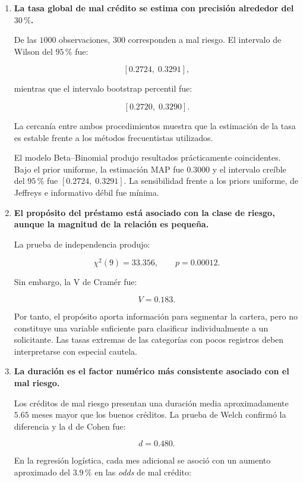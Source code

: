 \begin{enumerate}

    \item \textbf{La tasa global de mal crédito se estima con precisión
    alrededor del \(30\,\%\).}

    De las \(1000\) observaciones, \(300\) corresponden a mal riesgo. El
    intervalo de Wilson del \(95\,\%\) fue:

    \[
    [0.2724,\;0.3291],
    \]

    mientras que el intervalo bootstrap percentil fue:

    \[
    [0.2720,\;0.3290].
    \]

    La cercanía entre ambos procedimientos muestra que la estimación de
    la tasa es estable frente a los métodos frecuentistas utilizados.

    El modelo Beta--Binomial produjo resultados prácticamente
    coincidentes. Bajo el prior uniforme, la estimación MAP fue
    \(0.3000\) y el intervalo creíble del \(95\,\%\) fue
    \([0.2724,\;0.3291]\). La sensibilidad frente a los priors uniforme,
    de Jeffreys e informativo débil fue mínima.

    \item \textbf{El propósito del préstamo está asociado con la clase de
    riesgo, aunque la magnitud de la relación es pequeña.}

    La prueba de independencia produjo:

    \[
    \chi^2(9)=33.356,
    \qquad
    p=0.00012.
    \]

    Sin embargo, la V de Cramér fue:

    \[
    V=0.183.
    \]

    Por tanto, el propósito aporta información para segmentar la cartera,
    pero no constituye una variable suficiente para clasificar
    individualmente a un solicitante. Las tasas extremas de las categorías
    con pocos registros deben interpretarse con especial cautela.

    \item \textbf{La duración es el factor numérico más consistente
    asociado con el mal riesgo.}

    Los créditos de mal riesgo presentan una duración media aproximadamente
    \(5.65\) meses mayor que los buenos créditos. La prueba de Welch
    confirmó la diferencia y la d de Cohen fue:

    \[
    d=0.480.
    \]

    En la regresión logística, cada mes adicional se asoció con un aumento
    aproximado del \(3.9\,\%\) en las \textit{odds} de mal crédito:


\end{enumerate}
